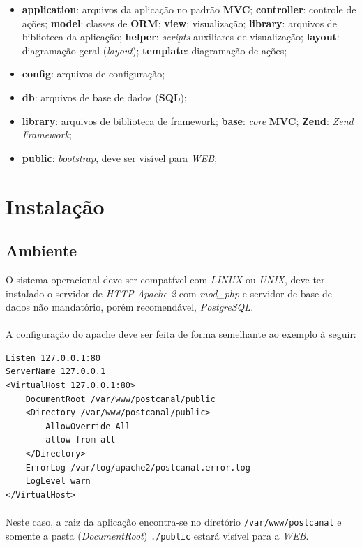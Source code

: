 \documentclass[a4paper,12pt]{article}
\begin{document}
\begin{itemize}
\item \textbf{application}: arquivos da aplicação no padrão \textbf{MVC};
\subitem \textbf{controller}: controle de ações;
\subitem \textbf{model}: classes de \textbf{ORM};
\subitem \textbf{view}: visualização;
\subitem \textbf{library}: arquivos de biblioteca da aplicação;
\subsubitem \textbf{helper}: \emph{scripts} auxiliares de visualização;
\subsubitem \textbf{layout}: diagramação geral (\emph{layout});
\subsubitem \textbf{template}: diagramação de ações;
\item \textbf{config}: arquivos de configuração;
\item \textbf{db}: arquivos de base de dados (\textbf{SQL});
\item \textbf{library}: arquivos de biblioteca de framework;
\subitem \textbf{base}: \emph{core} \textbf{MVC};
\subitem \textbf{Zend}: \emph{Zend Framework};
\item \textbf{public}: \emph{bootstrap}, deve ser visível para \emph{WEB};
\end{itemize}


\section{Instalação}

\subsection{Ambiente}
O sistema operacional deve ser compatível com \emph{LINUX} ou \emph{UNIX}, deve ter instalado o servidor de \emph{HTTP} \emph{Apache 2} com \emph{mod\_php} e servidor de base de dados não mandatório, porém recomendável, \emph{PostgreSQL}.

\paragraph{}
A configuração do apache deve ser feita de forma semelhante ao exemplo à seguir:

\begin{verbatim}
Listen 127.0.0.1:80
ServerName 127.0.0.1
<VirtualHost 127.0.0.1:80>
    DocumentRoot /var/www/postcanal/public
    <Directory /var/www/postcanal/public>
        AllowOverride All
        allow from all
    </Directory>
    ErrorLog /var/log/apache2/postcanal.error.log
    LogLevel warn
</VirtualHost>
\end{verbatim}

\paragraph{}
Neste caso, a raiz da aplicação encontra-se no diretório \texttt{/var/www/postcanal} e somente a pasta (\emph{DocumentRoot}) \texttt{./public} estará visível para a \emph{WEB}.
\end{document}
